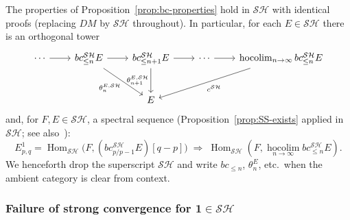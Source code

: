 \documentclass[12pt,a4paper]{article}
\theoremstyle{definition}
\newcommand{\SH}{\mathcal{SH}}
\newcommand{\hocolim}{\operatorname*{hocolim}}
\newcommand{\Hom}{\operatorname{Hom}}
\begin{document}
The properties of Proposition~\ref{prop:bc-properties} hold in $\SH$ with identical
proofs (replacing $DM$ by $\SH$ throughout).  In particular, for each $E\in\SH$
there is an orthogonal tower
\[
\begin{tikzcd}[column sep=2.2em, row sep=2.6em]
  \cdots \ar[r]
    & bc_{\leq n}^{\SH}E \ar[r] \ar[dr,"\theta_n^{E,\SH}"']
    & bc_{\leq n+1}^{\SH}E \ar[r] \ar[d,"\theta_{n+1}^{E,\SH}"']
    & \cdots \ar[r]
    & \hocolim_{n\to\infty}bc_{\leq n}^{\SH}E \ar[dll,"c^{\SH}"]
  \\
    &
    & E
    &
    &
\end{tikzcd}
\]
and, for $F,E\in\SH$, a spectral sequence (Proposition~\ref{prop:SS-exists} applied
in $\SH$; see also~\cite{Pel14}):
\[
  E^1_{p,q} = \Hom_{\SH}\!\bigl(F,(bc_{p/p-1}^{\SH}E)[q-p]\bigr)
  \;\Rightarrow\;
  \Hom_{\SH}(F,\hocolim_{n\to\infty}bc_{\leq n}^{\SH}E).
\]
We henceforth drop the superscript $\SH$ and write $bc_{\leq n}$, $\theta_n^E$, etc.\
when the ambient category is clear from context.

\subsubsection{Failure of strong convergence for $\mathbf{1}\in\SH$}
\end{document}
